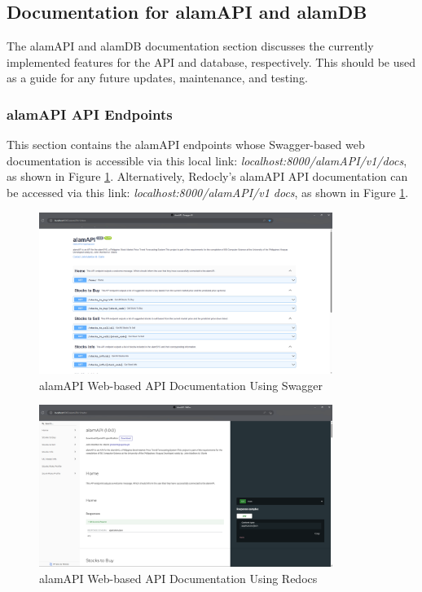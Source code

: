 \subsection{Documentation for alamAPI and alamDB}
\label{subsubsec:doc_API_DB}
The alamAPI and alamDB documentation section discusses the currently implemented 
features for the API and database, respectively. This should be used as a guide 
for any future updates, maintenance, and testing.

\subsubsection{alamAPI API Endpoints}
\label{subsubsec:alamAPI_API_endpoints}
This section contains the alamAPI endpoints whose Swagger-based web 
documentation is accessible via this local link: \textit{localhost:8000/alamAPI/v1/docs},
as shown in Figure \ref{fig:alamapi_swagger}. 
Alternatively, Redocly's alamAPI API documentation can be accessed via this 
link: \textit{localhost:8000/alamAPI/v1 docs},
as shown in Figure \ref{fig:alamapi_swagger}.
\\

\begin{figure}[ht]
    \centering
    \includegraphics[width=0.85\textwidth]{./assets/Chapter_4/Documentation/alamAPI_swagger.png}
    \caption{alamAPI Web-based API Documentation Using Swagger}
    \label{fig:alamapi_swagger}
\end{figure}
\FloatBarrier

\begin{figure}[ht]
    \centering
    \includegraphics[width=0.85\textwidth]{./assets/Chapter_4/Documentation/alamAPI_redoc.png}
    \caption{alamAPI Web-based API Documentation Using Redocs}
    \label{fig:alamAPI_redoc}
\end{figure}
\FloatBarrier

